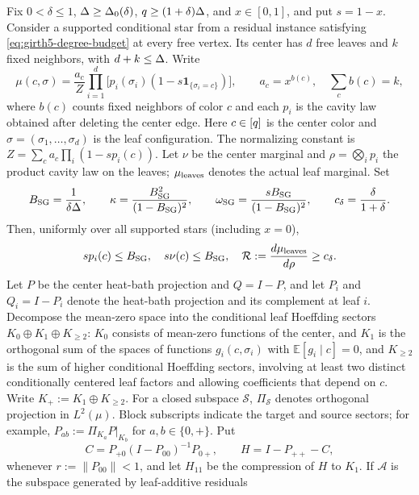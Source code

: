 \begin{lemma}
\label{lem:girth5-star-bounds}
Fix $0<\delta\leq1$, $\Delta\geq\Delta_0(\delta)$,
$q\ge(1+\delta)\Delta$, and $x\in[0,1]$, and put
$s=1-x$.  Consider a supported conditional star from a residual instance
satisfying \eqref{eq:girth5-degree-budget} at every free vertex.  Its center
has $d$ free leaves and $k$ fixed neighbors, with $d+k\leq\Delta$.  Write
\[
 \mu(c,\sigma)=\frac{a_c}{Z}\prod_{i=1}^{d}
 \bigl[p_i(\sigma_i)(1-s\mathbf1_{\{\sigma_i=c\}})\bigr],
 \qquad a_c=x^{b(c)},\quad \sum_cb(c)=k,
\]
where $b(c)$ counts fixed neighbors of color $c$ and each $p_i$ is
the cavity law obtained after deleting the center edge.
Here $c\in[q]$ is the center color and
$\sigma=(\sigma_1,\ldots,\sigma_d)$ is the leaf configuration.  The
normalizing constant is $Z=\sum_c a_c\prod_i(1-sp_i(c))$.
Let $\nu$ be the center marginal and $\rho=\bigotimes_i p_i$ the product
cavity law on the leaves; $\mu_{\rm leaves}$ denotes the actual leaf
marginal.  Set
\[
 B_{\rm SG}=\frac{1}{\delta\Delta},\qquad
 \kappa=\frac{B_{\rm SG}^2}{(1-B_{\rm SG})^2},\qquad
 \omega_{\rm SG}=\frac{sB_{\rm SG}}{(1-B_{\rm SG})^2},\qquad c_\delta=\frac{\delta}{1+\delta}.
\]
Then, uniformly over all supported stars (including $x=0$),
\begin{equation}\label{eq:sg-star-density}
 s p_i(c)\le B_{\rm SG},\quad s\nu(c)\le B_{\rm SG},\quad
 \mathcal R:=\frac{d\mu_{\rm leaves}}{d\rho}\ge c_\delta.
\end{equation}
Let $P$ be the center heat-bath projection and $Q=I-P$, and let
$P_i$ and $Q_i=I-P_i$ denote the heat-bath projection and its complement at
leaf $i$.  Decompose the mean-zero space into the conditional leaf Hoeffding
sectors $K_0\oplus K_1\oplus K_{\ge2}$: $K_0$ consists of mean-zero
functions of the center, and $K_1$ is the orthogonal sum of the spaces of functions
$g_i(c,\sigma_i)$ with $\mathbb E[g_i\mid c]=0$, and $K_{\ge2}$ is the
sum of higher conditional Hoeffding sectors, involving at least two
distinct conditionally centered leaf factors and allowing coefficients
that depend on $c$.
Write $K_+:=K_1\oplus K_{\ge2}$.  For a closed subspace $\mathcal S$,
$\Pi_{\mathcal S}$ denotes orthogonal projection in $L^2(\mu)$.
Block subscripts indicate the target and source sectors; for example,
$P_{ab}:=\Pi_{K_a}P|_{K_b}$ for $a,b\in\{0,+\}$.  Put
\[
 C=P_{+0}(I-P_{00})^{-1}P_{0+},\qquad H=I-P_{++}-C,
\]
whenever $r:=\|P_{00}\|<1$, and let $H_{11}$ be the compression of $H$
to $K_1$.  If $\mathcal A$ is the subspace generated by
leaf-additive residuals

\end{lemma}
